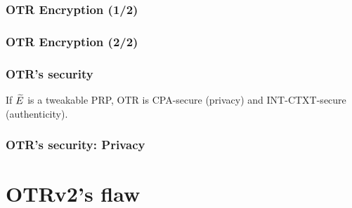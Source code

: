 \documentclass{beamer}
\begin{document}
	
\def\crossoffset{0.8cm}

	\begin{frame}
		\frametitle{OTR Encryption (1/2)}
				\begin{center}
					\begin{tikzpicture}[
						scale=1,
						node distance=1.8cm,
						line width = 0.5pt,
					]
						
					\end{tikzpicture}
				\end{center}		
	\end{frame}

	\begin{frame}
		\frametitle{OTR Encryption (2/2)}
				\begin{center}

						
				\end{center}		
	\end{frame}


	\begin{frame}
		\frametitle{OTR's security}
		\begin{theorem}[{Theorem 3 of [Min14]}]
			If $\tE$ is a tweakable PRP, OTR is CPA-secure (privacy) and INT-CTXT-secure (authenticity).
		\end{theorem}

	\end{frame}

	\begin{frame}
		\frametitle{OTR's security: Privacy}
				\begin{center}
					\begin{tikzpicture}[
						scale=1,
						node distance=1.8cm,
						line width = 0.5pt,
					]
						
					\end{tikzpicture}
				\end{center}		
	\end{frame}
	

\section{OTRv2's flaw} %
\label{sec:otrv2_s_flaw}
\end{document}
